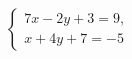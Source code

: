 \begin{ex}
	\begin{condition}
		\( \left\{
		\begin{array}{l}
			7x-2y+3=9,\\
			x+4y+7=-5
		\end{array}
		\right. \)
	\end{condition}
\end{ex}
